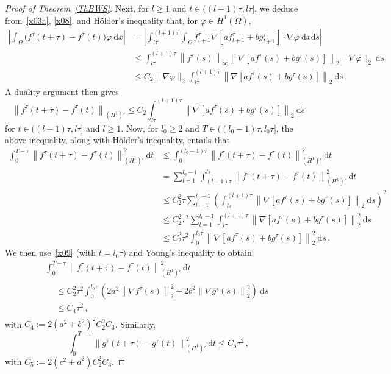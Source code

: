 \documentclass[AHL,Unicode,longabstracts,published]{cedram}
\newcommand{\rmd}{\mathrm{d}}
\begin{document}
\begin{proof}[Proof of Theorem~\ref{ThBWS}]
Next, for $l\ge 1$ and $t\in ((l-1)\tau,l\tau]$, we deduce from~\eqref{x03a}, \eqref{x08}, and H\"older's inequality that, for $\varphi\in H^1(\Omega)$,
\begin{align*}
\left| \int_\Omega \big(f^{\tau}(t+\tau) - f^\tau(t) \big) \varphi\ \rmd x \right| & =
\left| \int_{l\tau}^{(l+1) \tau} \int_\Omega f_{l+1}^\tau \nabla\left[af_{l+1}^\tau + b g_{l+1}^\tau\right] \cdot\nabla \varphi\ \rmd x\rmd s \right| \\
& \le \int_{l\tau}^{(l+1) \tau} \left\| f^\tau(s)\right\|_\infty \left\|\nabla\left[af^\tau(s) + b g^\tau(s)\right]\right\|_2 \|\nabla\varphi\|_2\ \rmd s \\
& \le C_2 \|\nabla\varphi\|_2 \int_{l\tau}^{(l+1) \tau} \left\|\nabla\left[af^\tau(s) + b g^\tau(s)\right]\right\|_2\ \rmd s \,.
\end{align*}
A duality argument then gives
\begin{equation*}
\left\| f^{\tau}(t+\tau) - f^\tau(t) \right\|_{(H^1)'} \le C_2 \int_{l\tau}^{(l+1) \tau} \left\|\nabla\left[af^\tau(s) + b g^\tau(s)\right]\right\|_2\ \rmd s
\end{equation*}
for $t\in ((l-1)\tau,l\tau]$ and $l\ge 1$. Now, for $l_0\ge 2$ and $T\in ((l_0-1)\tau,l_0\tau]$, the above inequality, along with H\"older's inequality, entails that
\begin{align*}
\int_0^{T-\tau} \left\| f^{\tau}(t+\tau) - f^\tau(t) \right\|_{(H^1)'}^2\ \rmd t & \le \int_0^{(l_0-1)\tau} \left\| f^{\tau}(t+\tau) - f^\tau(t)\right\|_{(H^1)'}^2\ \rmd t \\
& =\sum_{l=1}^{l_0-1} \int_{(l-1)\tau}^{l\tau} \left\| f^{\tau}(t+\tau) - f^\tau(t) \right\|_{(H^1)'}^2\ \rmd t \\
& \le C_2^2 \tau \sum_{l=1}^{l_0-1} \left(\int_{l\tau}^{(l+1) \tau} \left\|\nabla\left[af^\tau(s) + b g^\tau(s)\right]\right\|_2\ \rmd s \right)^2\\
& \le C_2^2 \tau^2 \sum_{l=1}^{l_0-1} \int_{l\tau}^{(l+1) \tau} \left\|\nabla\left[af^\tau(s) + b g^\tau(s)\right]\right\|_2^2\ \rmd s \\
& \le C_2^2 \tau^2 \int_{0}^{l_0 \tau}\left\|\nabla\left[af^\tau(s) + b g^\tau(s)\right]\right\|_2^2\ \rmd s\,.
\end{align*}
We then use~\eqref{x09} (with $t=l_0\tau$) and Young's inequality to obtain
\begin{multline}\label{x10}
\int_0^{T-\tau} \left\| f^{\tau}(t+\tau) - f^\tau(t) \right\|_{(H^1)'}^2\ \rmd t\\
\begin{aligned}
& \le C_2^2 \tau^2
\int_{0}^{l_0\tau} \left(2 a^2 \left\|\nabla f^\tau(s)\right\|_2^2 + 2b^2 \left\|\nabla g^\tau(s)\right\|_2^2 \right)\ \rmd s \\
& \le C_4 \tau^2 \,, 
\end{aligned}
\end{multline}
with $C_4 := 2 (a^2+b^2)^2 C_2^2 C_3$. Similarly,
\begin{equation}\label{x11}
\int_0^{T-\tau} \left\| g^{\tau}(t+\tau) - g^\tau(t) \right\|_{(H^1)'}^2\ \rmd t \le C_5 \tau^2 \,, 
\end{equation}
with $C_5 := 2 (c^2+d^2) C_2^2 C_3$.


\end{proof}
\end{document}
